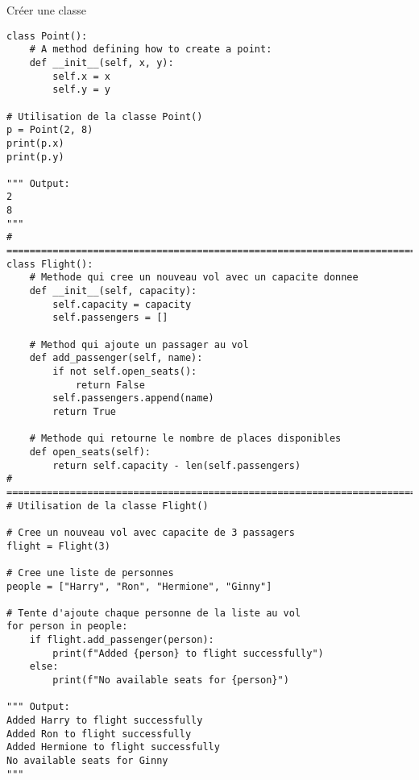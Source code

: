 \documentclass{report}
\begin{document}
\begin{codeEx*}{Créer une classe}{}
\begin{lstlisting}[style=PythonDraculaWhite]
class Point():
    # A method defining how to create a point:
    def __init__(self, x, y):
        self.x = x
        self.y = y

# Utilisation de la classe Point()
p = Point(2, 8)
print(p.x)
print(p.y)

""" Output:
2
8
"""
# =================================================================================
class Flight():
    # Methode qui cree un nouveau vol avec un capacite donnee
    def __init__(self, capacity):
        self.capacity = capacity
        self.passengers = []

    # Method qui ajoute un passager au vol
    def add_passenger(self, name):
        if not self.open_seats():
            return False
        self.passengers.append(name)
        return True

    # Methode qui retourne le nombre de places disponibles
    def open_seats(self):
        return self.capacity - len(self.passengers)
# =================================================================================
# Utilisation de la classe Flight()

# Cree un nouveau vol avec capacite de 3 passagers
flight = Flight(3)

# Cree une liste de personnes
people = ["Harry", "Ron", "Hermione", "Ginny"]

# Tente d'ajoute chaque personne de la liste au vol
for person in people:
    if flight.add_passenger(person):
        print(f"Added {person} to flight successfully")
    else:
        print(f"No available seats for {person}")

""" Output:
Added Harry to flight successfully
Added Ron to flight successfully
Added Hermione to flight successfully
No available seats for Ginny
"""
\end{lstlisting}
\end{codeEx*}
\end{document}
